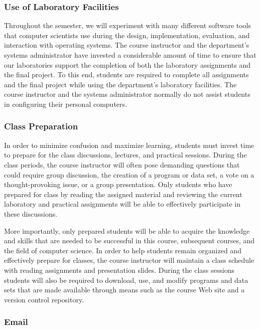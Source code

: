 \subsubsection*{Use of Laboratory Facilities}

Throughout the semester, we will experiment with many different software tools that computer scientists use during the
design, implementation, evaluation, and interaction with operating systems.  The course instructor and the
department's systems administrator have invested a considerable amount of time to ensure that our laboratories support
the completion of both the laboratory assignments and the final project.  To this end, students are required to complete
all assignments and the final project while using the department's laboratory facilities. The course instructor and the
systems administrator normally do not assist students in configuring their personal computers.

\subsubsection*{Class Preparation}

In order to minimize confusion and maximize learning, students must invest time to prepare for the class discussions,
lectures, and practical sessions.  During the class periods, the course instructor will often pose demanding questions
that could require group discussion, the creation of a program or data set, a vote on a thought-provoking issue, or a
group presentation.  Only students who have prepared for class by reading the assigned material and reviewing the
current laboratory and practical assignments will be able to effectively participate in these discussions.

More importantly, only prepared students will be able to acquire the knowledge and skills that are needed to be
successful in this course, subsequent courses, and the field of computer science.  In order to help students remain
organized and effectively prepare for classes, the course instructor will maintain a class schedule with reading
assignments and presentation slides.   During the class sessions students will also be required to download, use, and
modify programs and data sets that are made available through means such as the course Web site and a version control
repository.

\subsubsection*{Email}

